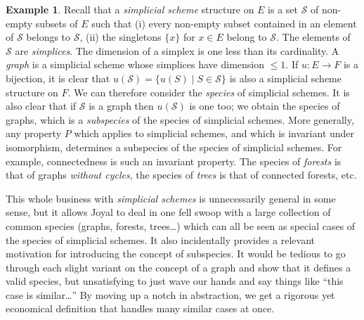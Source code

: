 \documentclass{amsart}
\theoremstyle{definition}
\newtheorem{ex}{Example}
\theoremstyle{remark}
\newcommand{\Simp}{\mathcal{S}}
\begin{document}
\begin{ex}
  Recall that a \emph{simplicial scheme} structure on $E$ is a set
  $\Simp$ of non-empty subsets of $E$ such that (i) every non-empty
  subset contained in an element of $\Simp$ belongs to $\Simp$, (ii)
  the singletons $\{x\}$ for $x \in E$ belong to $\Simp$. The elements
  of $\Simp$ are \emph{simplices}. The dimension of a simplex is one
  less than its cardinality. A \emph{graph} is a simplicial scheme
  whose simplices have dimension $\leq 1$. If $u : E \to F$ is a
  bijection, it is clear that $u (\Simp) = \{u(S) \mid S \in \Simp\}$
  is also a simplicial scheme structure on $F$. We can therefore
  consider the \emph{species} of simplicial schemes. It is also clear
  that if $\Simp$ is a graph then $u(\Simp)$ is one too; we obtain the
  species of graphs, which is a \emph{subspecies} of the species of
  simplicial schemes. More generally, any property $P$ which applies
  to simplicial schemes, and which is invariant under isomorphism,
  determines a subspecies of the species of simplicial schemes. For
  example, connectedness is such an invariant property. The species of
  \emph{forests} is that of graphs \emph{without cycles}, the species
  of \emph{trees} is that of connected forests, etc.

\begin{commentary}
  This whole business with \emph{simplicial schemes} is unnecessarily
  general in some sense, but it allows Joyal to deal in one fell swoop
  with a large collection of common species (graphs, forests,
  trees\dots) which can all be seen as special cases of the species of
  simplicial schemes. It also incidentally provides a relevant
  motivation for introducing the concept of subspecies.  It would be
  tedious to go through each slight variant on the concept of a graph
  and show that it defines a valid species, but unsatisfying to just
  wave our hands and say things like ``this case is similar\dots'' By
  moving up a notch in abstraction, we get a rigorous yet economical
  definition that handles many similar cases at once.


\end{commentary}
\end{ex}
\end{document}
